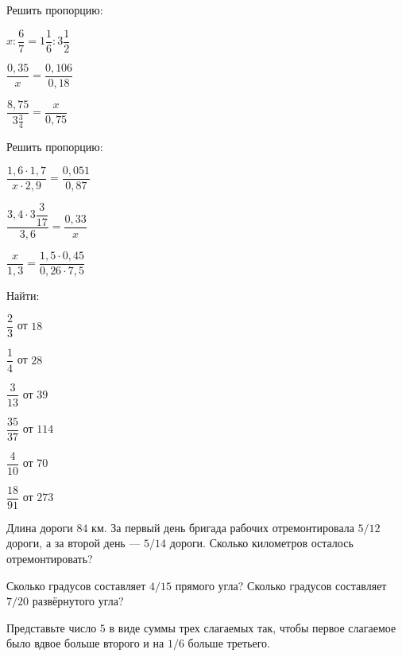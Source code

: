 \begin{listofex}
	\item Решить пропорцию:
	\begin{enumcols}[itemcolumns=3]
		\item \( x:\dfrac{6}{7}=1\dfrac{1}{6}:3\dfrac{1}{2} \)
		\item \( \dfrac{0,35}{x}=\dfrac{0,106}{0,18} \)
		\item \( \dfrac{8,75}{3\tfrac{3}{4}}=\dfrac{x}{0,75} \)
	\end{enumcols}
	\item Решить пропорцию:
	\begin{enumcols}[itemcolumns=3]
		\item \( \dfrac{1,6\cdot1,7}{x\cdot2,9}=\dfrac{0,051}{0,87} \)
		\item \( \dfrac{3,4\cdot3\dfrac{3}{17}}{3,6}=\dfrac{0,33}{x} \)
		\item \( \dfrac{x}{1,3}=\dfrac{1,5\cdot0,45}{0,26\cdot7,5} \)
	\end{enumcols}
	\item Найти:
	\begin{enumcols}[itemcolumns=3]
		\item \( \dfrac{2}{3} \) от \( 18 \)
		\item \( \dfrac{1}{4} \) от \( 28 \)
		\item \( \dfrac{3}{13} \) от \( 39 \)
		\item \( \dfrac{35}{37} \) от \( 114 \)
		\item \( \dfrac{4}{10} \) от \( 70 \)
		\item \( \dfrac{18}{91} \) от \( 273 \)
	\end{enumcols}
	\item Длина дороги \( 84 \) км. За первый день бригада рабочих отремонтировала \( 5/12 \) дороги, а за второй день --- \( 5/14 \) дороги. Сколько километров осталось отремонтировать?
	\item Сколько градусов составляет \( 4/15 \) прямого угла? Сколько градусов составляет \( 7/20 \) развёрнутого угла?
	\item Представьте число \( 5 \) в виде суммы трех слагаемых так, чтобы первое слагаемое было вдвое больше второго и на \( 1/6 \) больше третьего.
\end{listofex}
%	
%	
